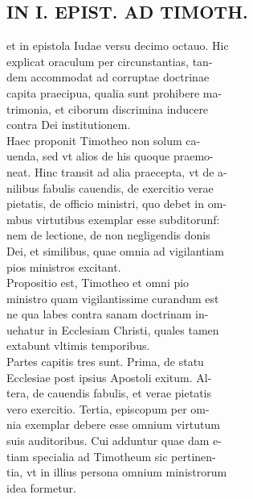 \documentclass{article}
\begin{document}
\begin{pages}
\section*{IN I. EPIST. AD TIMOTH. \\
                }
et in epistola Iudae versu decimo octauo. Hic \\
                explicat oraculum per circunstantias, tan- \\
                dem accommodat ad corruptae doctrinae \\
                capita praecipua, qualia sunt prohibere ma- \\
                trimonia, et ciborum discrimina inducere \\
                contra Dei institutionem. \\
                Haec proponit Timotheo non solum ca- \\
                uenda, sed vt alios de his quoque praemo- \\
                neat. Hinc transit ad alia praecepta, vt de a- \\
                nilibus fabulis cauendis, de exercitio verae \\
                pietatis, de officio ministri, quo debet in om- \\
                mbus virtutibus exemplar esse subditorunf: \\
                nem de lectione, de non negligendis donis \\
                Dei, et similibus, quae omnia ad vigilantiam \\
                pios ministros excitant. \\
                Propositio est, Timotheo et omni pio \\
                ministro quam vigilantissime curandum est \\
                ne qua labes contra sanam doctrinam in- \\
                uehatur in Ecclesiam Christi, quales tamen \\
                extabunt vltimis temporibus. \\
                Partes capitis tres sunt. Prima, de statu \\
                Ecclesiae post ipsius Apostoli exitum. Al- \\
                tera, de cauendis fabulis, et verae pietatis \\
                vero exercitio. Tertia, episcopum per om- \\
                nia exemplar debere esse omnium virtutum \\
                suis auditoribus. Cui adduntur quae dam e- \\
                tiam specialia ad Timotheum sic pertinen- \\
                tia, vt in illius persona omnium ministrorum \\
                idea formetur. \\
                

\end{pages}
\end{document}
